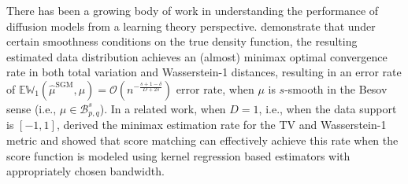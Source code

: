 \documentclass[12pts]{article}
\newcommand{\cO}{ \mathcal{O}}
\newcommand{\E}{\mathbb{E}}
\newcommand{\fW}{\mathbb{W}}
\begin{document}
There has been a growing body of work in understanding the performance of diffusion models from a learning theory perspective. \citet{oko2023diffusion} demonstrate that under certain smoothness conditions on the true density function, the resulting estimated data distribution achieves an (almost) minimax optimal convergence rate in both total variation and Wasserstein-1 distances, resulting in an error rate of  $\E \fW_1\left(\hat{\mu}^{\text{SGM}}, \mu\right) = \cO\left(n^{-\frac{s+1-\delta}{D+2s}}\right)$ error rate, when $\mu$ is $s$-smooth in the Besov sense (i.e., $\mu \in \mathcal{B}^s_{p,q}$).  In a related work, when $D=1$, i.e., when the data support is $[-1,1]$, \citet{dou2024optimalscorematchingoptimal} derived the minimax estimation rate for the TV and Wasserstein-1 metric and showed that score matching can effectively achieve this rate when the score function is modeled using kernel regression based estimators with appropriately chosen bandwidth. 
\end{document}

